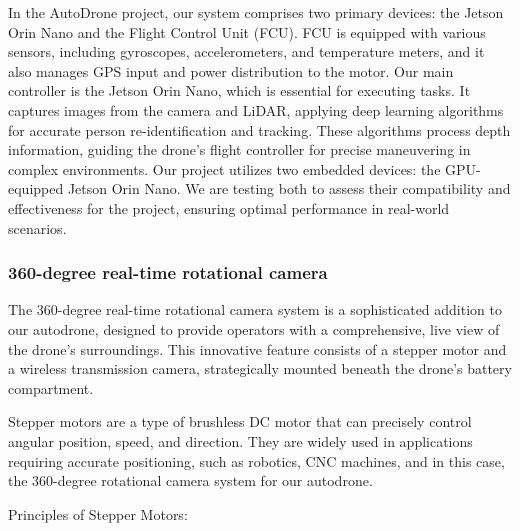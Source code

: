 \documentclass[conference]{IEEEtran}
\begin{document}
In the AutoDrone project, our system comprises two primary devices: the Jetson Orin Nano and the Flight Control Unit (FCU). FCU is equipped with various sensors, including gyroscopes, accelerometers, and temperature meters, and it also manages GPS input and power distribution to the motor.
Our main controller is the Jetson Orin Nano, which is essential for executing tasks. It captures images from the camera and LiDAR, applying deep learning algorithms for accurate person re-identification and tracking. These algorithms process depth information, guiding the drone’s
flight controller for precise maneuvering in complex environments.
Our project utilizes two embedded devices: the GPU-equipped Jetson Orin Nano. We are testing both to assess their compatibility and effectiveness for the project, ensuring optimal performance in real-world scenarios.


\subsubsection{360-degree real-time rotational camera
} 
The 360-degree real-time rotational camera system is a sophisticated addition to our autodrone, designed to provide operators with a comprehensive, live view of the drone's surroundings. This innovative feature consists of a stepper motor and a wireless transmission camera, strategically mounted beneath the drone's battery compartment.

Stepper motors are a type of brushless DC motor that can precisely control angular position, speed, and direction. They are widely used in applications requiring accurate positioning, such as robotics, CNC machines, and in this case, the 360-degree rotational camera system for our autodrone.

Principles of Stepper Motors:
\end{document}
